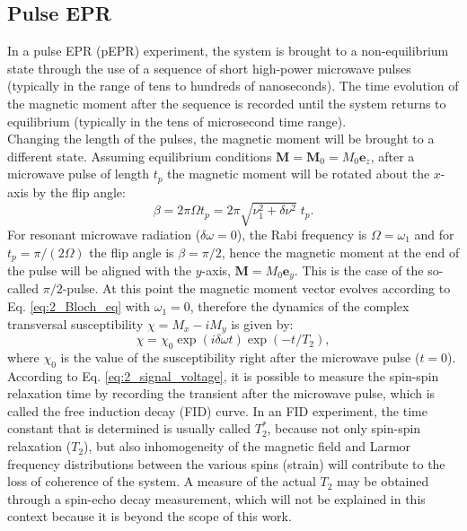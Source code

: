 \documentclass[a4paper]{book}
\newcommand{\mb}{\mathbf}
\newcommand{\mbe}{\mathbf{e}}
\begin{document}
	\subsection{Pulse EPR}
	\label{sec:pulse_epr}
	In a pulse EPR (pEPR) experiment, the system is brought to a non-equilibrium state through the use of a sequence of short high-power microwave pulses (typically in the range of tens to hundreds of nanoseconds). The time evolution of the magnetic moment after the sequence is recorded until the system returns to equilibrium (typically in the tens of microsecond time range).\\
	Changing the length of the pulses, the magnetic moment will be brought to a different state. Assuming equilibrium conditions $\mb{M} = \mb{M}_0 = M_0\mbe_z$, after a microwave pulse of length $t_p$ the magnetic moment will be rotated about the $x$-axis by the flip angle:
	\begin{equation}
		\label{eq:2_flip_angle}
		\beta = 2\pi\Omega t_p = 2\pi\sqrt{\nu_1^2 + \delta\nu^2}\;t_p.
	\end{equation}
	For resonant microwave radiation ($\delta\omega = 0$), the Rabi frequency is $\Omega = \omega_1$ and for $t_p = \pi/(2\Omega)$ the flip angle is $\beta = \pi/2$, hence the magnetic moment at the end of the pulse will be aligned with the $y$-axis, $\textbf{M} = M_0\textbf{e}_{y}$. This is the case of the so-called $\pi/2$-pulse. At this point the magnetic moment vector evolves according to Eq. \eqref{eq:2_Bloch_eq} with $\omega_1 = 0$, therefore the dynamics of the complex transversal susceptibility $\chi= M_x - iM_y$ is given by:
	\begin{equation}
		\label{eq:2_dynamics_of_susceptibility}
		\chi = \chi_0\exp(i\delta\omega t)\exp(-t/T_2),
	\end{equation}
	where $\chi_0$ is the value of the susceptibility right after the microwave pulse ($t=0$). According to Eq. \eqref{eq:2_signal_voltage}, it is possible to measure the spin-spin relaxation time by recording the transient after the microwave pulse, which is called the free induction decay (FID) curve. In an FID experiment, the time constant that is determined is usually called $T_2^*$, because not only spin-spin relaxation ($T_2$), but also inhomogeneity of the magnetic field and Larmor frequency distributions between the various spins (strain) will contribute to the loss of coherence of the system. A measure of the actual $T_2$ may be obtained through a spin-echo decay measurement, which will not be explained in this context because it is beyond the scope of this work.\\
\end{document}
